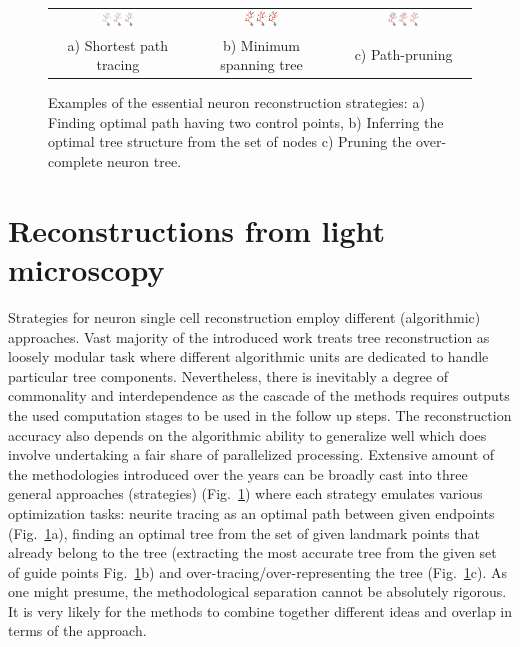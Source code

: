 \begin{figure}
	\centering
	\begin{tabular}{c@{\hspace{1em}}c@{\hspace{1em}}c@{\hspace{1em}}}
		\includegraphics[width=0.25\textwidth]{ch1_fig2a} & 
		\includegraphics[width=0.25\textwidth]{ch1_fig2b} & 
		\includegraphics[width=0.25\textwidth]{ch1_fig2c} \\
		a) Shortest path tracing & b) Minimum spanning tree & c) Path-pruning
	\end{tabular}
	\caption{Examples of the essential neuron reconstruction strategies: a) Finding optimal path having two control points, b) Inferring the  optimal tree structure from the set of nodes c) Pruning the over-complete neuron tree.}
	\label{ch1_fig2}
\end{figure}

\section{Reconstructions from light microscopy}
Strategies for neuron single cell reconstruction employ different (algorithmic) approaches. Vast majority of the introduced work treats tree reconstruction as loosely modular task where different algorithmic units are dedicated to handle particular tree components. Nevertheless, there is inevitably a degree of commonality and interdependence as the cascade of the methods requires outputs the used computation stages to be used in the follow up steps. The reconstruction accuracy also depends on the algorithmic ability to generalize well which does involve undertaking a fair share of parallelized processing. Extensive amount of the methodologies introduced over the years \cite{meijering2010neuron,donohue2011automated,acciai2016automated} can be broadly cast into three general approaches (strategies) (Fig.~\ref{ch1_fig2}) where each strategy emulates various optimization tasks: neurite tracing as an optimal path between given endpoints (Fig.~\ref{ch1_fig2}a), finding an optimal tree from the set of given landmark points that already belong to the tree (extracting the most accurate tree from the given set of guide points Fig.~\ref{ch1_fig2}b) and over-tracing/over-representing the tree (Fig.~\ref{ch1_fig2}c). As one might presume, the methodological separation cannot be absolutely rigorous. It is very likely for the methods to combine together different ideas and overlap in terms of the approach.

